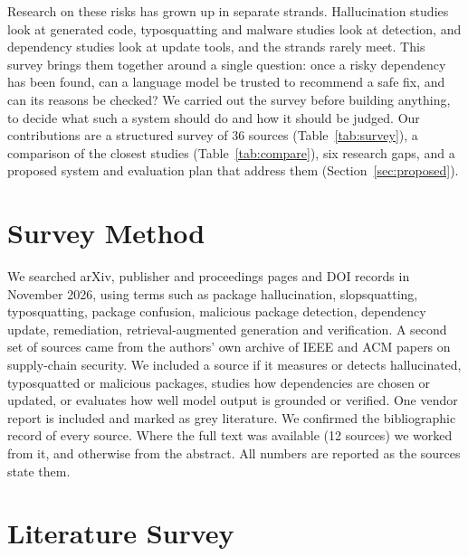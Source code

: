 \documentclass[conference]{IEEEtran}
\begin{document}
Research on these risks has grown up in separate strands. Hallucination studies look at generated code,
typosquatting and malware studies look at detection, and dependency studies look at update tools, and the strands
rarely meet. This survey brings them together around a single question: once a risky dependency has been found,
can a language model be trusted to recommend a safe fix, and can its reasons be checked? We carried out the survey
before building anything, to decide what such a system should do and how it should be judged. Our contributions are a structured survey of 36
sources (Table~\ref{tab:survey}), a comparison of the closest studies (Table~\ref{tab:compare}), six research gaps,
and a proposed system and evaluation plan that address them (Section~\ref{sec:proposed}).

\section{Survey Method}
\label{sec:method}
We searched arXiv, publisher and proceedings pages and DOI records in November 2026, using terms such as package
hallucination, slopsquatting, typosquatting, package confusion, malicious package detection, dependency update,
remediation, retrieval-augmented generation and verification. A second set of sources came from the authors' own
archive of IEEE and ACM papers on supply-chain security. We included a source if it measures or detects
hallucinated, typosquatted or malicious packages, studies how dependencies are chosen or updated, or evaluates how
well model output is grounded or verified. One vendor report is included and marked as grey literature. We
confirmed the bibliographic record of every source. Where the full text was available (12 sources) we worked from
it, and otherwise from the abstract. All numbers are reported as the sources state them.

\section{Literature Survey}
\label{sec:survey}
\end{document}
